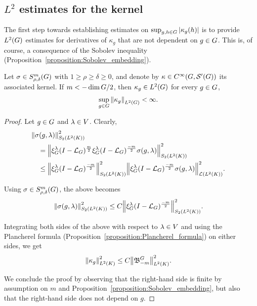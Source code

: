\subsection{\texorpdfstring{$L^2$}{L2} estimates for the kernel}

The first step towards establishing estimates on $\sup_{g, h \in \Group} \abs {\kappa_g(h)}$
is to provide $\Lebesgue 2 \Group$ estimates for derivatives of $\kappa_g$ that are not dependent on $g \in \Group$.
This is, of course, a consequence of the Sobolev inequality (Proposition~\ref{proposition:Sobolev_embedding}).

\begin{proposition}
\label{proposition:L2_bound_on_the_kernel}
    Let $\sigma \in \SymbolClass m {\rho, \delta}$ with $1 \geq \rho \geq \delta \geq 0$,
    and denote by $\kappa \in \SmoothFunctions {\Group, \TemperedDistributions \Group}$ its associated kernel.
    If $m < -\dim \Group / 2$,
    then $\kappa_g \in \Lebesgue 2 \Group$ for every $g \in \Group$,
    \begin{align*}
        \sup_{g \in \Group} \norm [\Lebesgue 2 \Group] {\kappa_g} < \infty.
    \end{align*}
\end{proposition}
\begin{proof}
    Let $g \in \Group$ and $\lambda \in \VectorSpace$.
    Clearly,
    \begin{align*}
        &\norm [\SchattenClasses 2 {\Lebesgue 2 \CompactGroup}] {\sigma(g, \lambda)}^2\\
        &\quad= \norm [\SchattenClasses 2 {\Lebesgue 2 \CompactGroup}] {\Rep \lambda \BesselPotential m \Rep \lambda \BesselPotential {-m} \sigma(g, \lambda)}^2\\
        &\quad\leq
        \norm [\SchattenClasses 2 {\Lebesgue 2 \CompactGroup}] {\Rep \lambda \BesselPotential {-m}}^2
        \norm [\Lin {\Lebesgue 2 \CompactGroup}] {\Rep \lambda \BesselPotential {-m} \sigma(g, \lambda)}^2.
    \end{align*}

    Using $\sigma \in \SymbolClass m {\rho, \delta}$,
    the above becomes
    \begin{align*}
        \norm [\SchattenClasses 2 {\Lebesgue 2 \CompactGroup}] {\sigma(g, \lambda)}^2
        \leq C \norm [\SchattenClasses 2 {\Lebesgue 2 \CompactGroup}] {\Rep \lambda \BesselPotential {-m}}^2.
    \end{align*}

    Integrating both sides of the above with respect to $\lambda \in \VectorSpace$
    and using the Plancherel formula (Proposition~\ref{proposition:Plancherel_formula}) on either sides,
    we get
    \begin{align*}
        \norm [\Lebesgue 2 \CompactGroup] {\kappa_g}^2 \leq C \norm [\Lebesgue 2 \CompactGroup] {\BesselPotentialKernel {-m}}^2.
    \end{align*}

    We conclude the proof by observing that the right-hand side is finite by assumption on $m$ and Proposition~\ref{proposition:Sobolev_embedding},
    but also that the right-hand side does not depend on $g$.
\end{proof}

